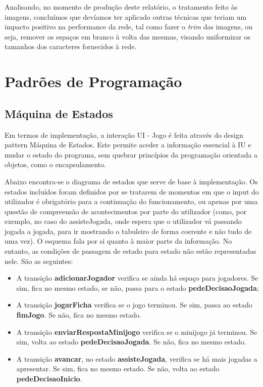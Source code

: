 \documentclass[11pt]{article}
\begin{document}
	Analisando, no momento de produção deste relatório, o tratamento feito às imagens, concluímos que devíamos ter aplicado outras técnicas que teriam um impacto positivo na performance da rede, tal como fazer o \textit{trim} das imagens, ou seja, remover os espaços em branco à volta das mesmas, visando uniformizar os tamanhos dos caracteres fornecidos à rede.

	\pagebreak
	
	\large
	\section{Padrões de Programação}
	\subsection{Máquina de Estados}
	\normalsize
	
	 Em termos de implementação, a interação UI - Jogo é feita através do design pattern Máquina de Estados. Este permite aceder a informação essencial à IU e mudar o estado do programa, sem quebrar princípios da programação orientada a objetos, como o encapsulamento.
	 
	 Abaixo encontra-se o diagrama de estados que serve de base à implementação. Os estados incluídos foram definidos por se tratarem de momentos em que o input do utilizador é obrigatório para a continuação do funcionamento, ou apenas por uma questão de compreensão de acontecimentos por parte do utilizador (como, por exemplo, no caso do assisteJogada, onde espera que o utilizador vá passando jogada a jogada, para ir mostrando o tabuleiro de forma coerente e não tudo de uma vez). O esquema fala por si quanto à maior parte da informação. No entanto, as condições de passagem de estado para estado não estão representadas nele. São as seguintes:
	 
	 \begin{itemize}
	 	\item A transição \textbf{adicionarJogador} verifica se ainda há espaço para jogadores. Se sim, fica no mesmo estado, se não, passa para o estado \textbf{pedeDecisaoJogada};
	 	\item A transição \textbf{jogarFicha} verifica se o jogo terminou. Se sim, passa ao estado \textbf{fimJogo}. Se não, fica no mesmo estado.
	 	\item A transição \textbf{enviarRespostaMinijogo} verifica se o minijogo já terminou. Se sim, volta ao estado \textbf{pedeDecisaoJogada}. Se não, fica no mesmo estado.
	 	\item A transição \textbf{avancar}, no estado \textbf{assisteJogada}, verifica se há mais jogadas a apresentar. Se sim, fica no mesmo estado. Se não, volta ao estado \textbf{pedeDecisaoInicio}.
	 \end{itemize}
	 
\end{document}
